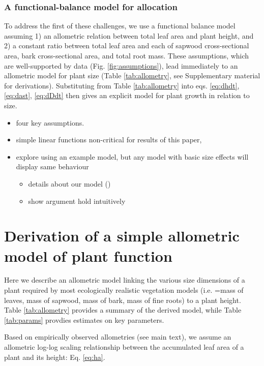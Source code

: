 \documentclass[a4paper,11pt]{article}
\begin{document}
\subsubsection{A functional-balance model for allocation}

To address the first of these challenges, we use a functional balance
model \citep{Yokozawa-1995, Falster-2011} assuming
1) an allometric relation between total leaf area and plant height, and
2) a constant ratio between total leaf area and each of sapwood
cross-sectional area, bark cross-sectional area, and total root mass.
These assumptions, which are well-supported by data (Fig.
\ref{fig:assumptions}), lead immediately to an allometric model for plant
size (Table \ref{tab:allometry}, see Supplementary material for
derivations). Substituting from Table \ref{tab:allometry} into eqs.
\ref{eq:dhdt}, \ref{eq:dast}, \ref{eq:dDdt} then gives an explicit model
for plant growth in relation to size.


\begin{itemize}
\itemsep1pt\parskip0pt
\item
  four key assumptions.
\item
  simple linear functions non-critical for results of this paper,
\item
  explore using an example model, but any model with basic size effects
  will display same behaviour

  \begin{itemize}
  \itemsep1pt\parskip0pt
  \item
    details about our model ()
  \item
    show argument hold intuitively
  \end{itemize}
\end{itemize}


\section{Derivation of a simple allometric model of plant function}

Here we describe an allometric model linking the various size dimensions
of a plant required by most ecologically realistic vegetation models
(i.e. =mass of leaves, mass of sapwood, mass of bark, mass of fine
roots) to a plant height. Table \ref{tab:allometry} provides a summary
of the derived model, while Table \ref{tab:params} provdies estimates on
key parameters.

Based on empirically observed allometries (see main text), we assume an
allometric log-log scaling relationship between the accumulated leaf
area of a plant and its height: Eq. \ref{eq:ha}.
\end{document}
